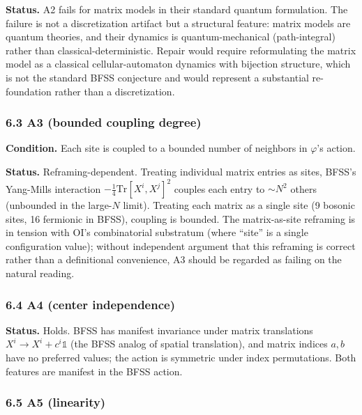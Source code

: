 \documentclass[
]{article}
\begin{document}
\textbf{Status.} A2 fails for matrix models in their standard quantum
formulation. The failure is not a discretization artifact but a
structural feature: matrix models are quantum theories, and their
dynamics is quantum-mechanical (path-integral) rather than
classical-deterministic. Repair would require reformulating the matrix
model as a classical cellular-automaton dynamics with bijection
structure, which is not the standard BFSS conjecture and would represent
a substantial re-foundation rather than a discretization.

\hypertarget{a3-bounded-coupling-degree}{%
\subsubsection{6.3 A3 (bounded coupling
degree)}\label{a3-bounded-coupling-degree}}

\textbf{Condition.} Each site is coupled to a bounded number of
neighbors in \(\varphi\)'s action.

\textbf{Status.} Reframing-dependent. Treating individual matrix entries
as sites, BFSS's Yang-Mills interaction
\(-\frac{1}{4}\text{Tr}[X^i, X^j]^2\) couples each entry to \(\sim N^2\)
others (unbounded in the large-\(N\) limit). Treating each matrix as a
single site (9 bosonic sites, 16 fermionic in BFSS), coupling is
bounded. The matrix-as-site reframing is in tension with OI's
combinatorial substratum (where ``site'' is a single configuration
value); without independent argument that this reframing is correct
rather than a definitional convenience, A3 should be regarded as failing
on the natural reading.

\hypertarget{a4-center-independence}{%
\subsubsection{6.4 A4 (center
independence)}\label{a4-center-independence}}

\textbf{Status.} Holds. BFSS has manifest invariance under matrix
translations \(X^i \to X^i + c^i \mathbb{1}\) (the BFSS analog of
spatial translation), and matrix indices \(a, b\) have no preferred
values; the action is symmetric under index permutations. Both features
are manifest in the BFSS action.

\hypertarget{a5-linearity}{%
\subsubsection{6.5 A5 (linearity)}\label{a5-linearity}}
\end{document}
